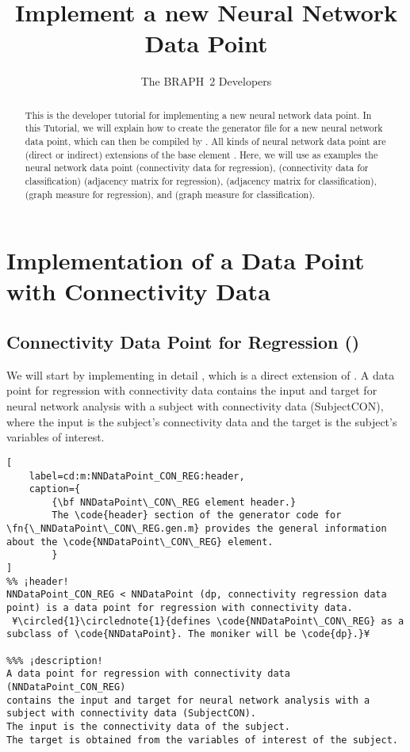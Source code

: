 \documentclass{tufte-handout}
\title{Implement a new Neural Network Data Point}
\author[The BRAPH~2 Developers]{The BRAPH~2 Developers}
\begin{document}
\maketitle

\begin{abstract}
\noindent
This is the developer tutorial for implementing a new neural network data point. 
In this Tutorial, we will explain how to create the generator file  for a new neural network data point, which can then be compiled by . All kinds of neural network data point are (direct or indirect) extensions of the base element . Here, we will use as examples the neural network data point  (connectivity data for regression),  (connectivity data for classification)  (adjacency matrix for regression),  (adjacency matrix for classification),  (graph measure for regression), and  (graph measure for classification).
\end{abstract}

\tableofcontents

\clearpage
\section{Implementation of a Data Point with Connectivity Data}

\subsection{Connectivity Data Point for Regression ()}

We will start by implementing in detail , which is a direct extension of .
A data point for regression with connectivity data  contains the input and target for neural network analysis with a subject with connectivity data (SubjectCON), where the input is the subject's connectivity data and the target is the subject's variables of interest.

\begin{lstlisting}[
	label=cd:m:NNDataPoint_CON_REG:header,
	caption={
		{\bf NNDataPoint\_CON\_REG element header.}
		The \code{header} section of the generator code for \fn{\_NNDataPoint\_CON\_REG.gen.m} provides the general information about the \code{NNDataPoint\_CON\_REG} element.
		}
]
%% ¡header!
NNDataPoint_CON_REG < NNDataPoint (dp, connectivity regression data point) is a data point for regression with connectivity data.
 ¥\circled{1}\circlednote{1}{defines \code{NNDataPoint\_CON\_REG} as a subclass of \code{NNDataPoint}. The moniker will be \code{dp}.}¥

%%% ¡description!
A data point for regression with connectivity data (NNDataPoint_CON_REG) 
contains the input and target for neural network analysis with a subject with connectivity data (SubjectCON).
The input is the connectivity data of the subject.
The target is obtained from the variables of interest of the subject.
\end{lstlisting}
\end{document}
